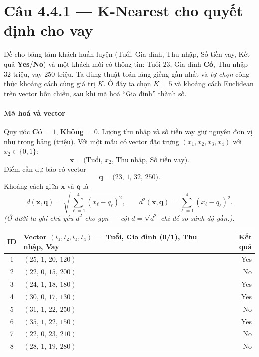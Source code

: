 \section*{Câu 4.4.1 --- K-Nearest cho quyết định cho vay}

Đề cho bảng tám khách huấn luyện (Tuổi, Gia đình, Thu nhập, Số tiền vay, Kết quả \textbf{Yes}/\textbf{No}) và một khách mới có thông tin: Tuổi $23$, Gia đình \textbf{Có}, Thu nhập $32$ triệu, vay $250$ triệu. Ta dùng thuật toán láng giềng gần nhất và \emph{tự chọn} công thức khoảng cách cùng giá trị $K$. Ở đây ta chọn $K=5$ và khoảng cách Euclidean trên vector bốn chiều, sau khi mã hoá ``Gia đình'' thành số.

\paragraph{Mã hoá và vector}
Quy ước \textbf{Có}$\,=1$, \textbf{Không}$\,=0$. Lượng thu nhập và số tiền vay giữ nguyên đơn vị như trong bảng (triệu). Với một mẫu có vector đặc trưng $(x_1,x_2,x_3,x_4)$ với $x_2\in\{0,1\}$:
\[
\mathbf{x}=\bigl(\text{Tuổi},\, x_2,\,\text{Thu nhập},\,\text{Số tiền vay}\bigr).
\]
Điểm cần dự báo có vector
\[
\mathbf{q}=\bigl(23,\,1,\,32,\,250\bigr).
\]
Khoảng cách giữa $\mathbf{x}$ và $\mathbf{q}$ là
\[
  d(\mathbf{x},\mathbf{q})=\sqrt{\sum_{\ell=1}^4(x_\ell-q_\ell)^2},
  \qquad
  d^{2}(\mathbf{x},\mathbf{q})=\sum_{\ell=1}^4(x_\ell-q_\ell)^{2}.
\]
\emph{(Ở dưới ta ghi chủ yếu $d^2$ cho gọn --- cột $d=\sqrt{d^{2}}$ chỉ để so sánh độ gần.).}

\begin{center}
{\small
\begin{tabular}{@{}clr@{}}\toprule
ID & Vector $(t_1,t_2,t_3,t_4)$ --- Tuổi, Gia đình (0/1), Thu nhập, Vay & Kết quả \\\midrule
1 & $(25,\,1,\,20,\,120)$ & Yes\\
2 & $(22,\,0,\,15,\,200)$ & No\\
3 & $(24,\,1,\,18,\,180)$ & Yes\\
4 & $(30,\,0,\,17,\,130)$ & Yes\\
5 & $(31,\,1,\,22,\,250)$ & No\\
6 & $(35,\,1,\,22,\,150)$ & Yes\\
7 & $(22,\,0,\,23,\,210)$ & No\\
8 & $(28,\,1,\,19,\,280)$ & No\\\bottomrule
\end{tabular}
}
\end{center}


